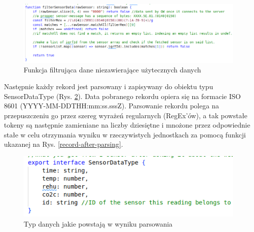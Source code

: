 \begin{figure}[H]
    \includegraphics[width=\textwidth]{zdj/app/filter.png}
    \caption{Funkcja filtrująca dane niezawierające użytecznych danych}
    \label{data-filter}
\end{figure}

Następnie każdy rekord jest parsowany i zapisywany do obiektu typu SensorDataType (Rys. \ref{data-type}). Data pobranego rekordu opiera się na formacie ISO 8601 (YYYY-MM-DDTHH:mm:ss.sssZ). 
Parsowanie rekordu polega na przepuszczeniu go przez szereg wyrażeń regularnych (RegEx'ów), a tak powstałe tokeny są następnie zamieniane na liczby
dziesiętne i mnożone przez odpowiednie stałe \cite{protronix-comms} w celu otrzymania wyniku w rzeczywistych jednostkach za pomocą funkcji ukazanej
na Rys. \ref{record-after-parsing}.

\begin{figure}[H]
    \includegraphics[width=\textwidth]{zdj/app/type.png}
    \caption{Typ danych jakie powstają w wyniku parsowania}
    \label{data-type}
\end{figure}

